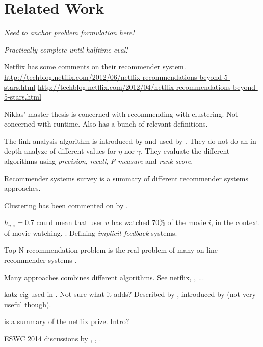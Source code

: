 \chapter{Related Work}\label{cha:relwork}

\textit{Need to anchor problem formulation here!}

\textit{Practically complete until halftime eval!}

Netflix has some comments on their recommender system.
\url{http://techblog.netflix.com/2012/06/netflix-recommendations-beyond-5-stars.html}
\url{http://techblog.netflix.com/2012/04/netflix-recommendations-beyond-5-stars.html}

Niklas' master thesis \citep{niklas}is concerned with recommending with clustering. Not concerned with runtime. Also has a bunch of relevant definitions.

The link-analysis algorithm is introduced by \citep{huang2004link} and used by \citep{huang2007comparison}. They do not do an in-depth analyze of different values for $\eta$ nor $\gamma$. They evaluate the different algorithms using \textit{precision}, \textit{recall}, \textit{F-measure} and \textit{rank score}.

Recommender systems survey \citep{bobadilla2013recommender} is a summary of different recommender systems approaches.

Clustering has been commented on by \citep{cacheda2011comparison}.

$h_{u, i} = 0.7$ could mean that user $u$ has watched 70\% of the movie $i$, in the context of movie watching. \citep{hu2008collaborative}. Defining \textit{implicit feedback} systems.

Top-N recommendation problem is the real problem of many on-line recommender systems \citep{lai2012hybrid}.

Many approaches combines different algorithms. See netflix, \citep{lai2012hybrid}, ...

katz-eig used in \citep{shin2012multi}. Not sure what it adds? Described by \citep{liben2007link}, introduced by \citep{katz1953new} (not very useful though).

\citep{bennett2007netflix} is a summary of the netflix prize. Intro?

ESWC 2014 discussions by \citep{di2014linked}, \citep{heitmann2014semstim}, \citep{ostuni2014linked}.
